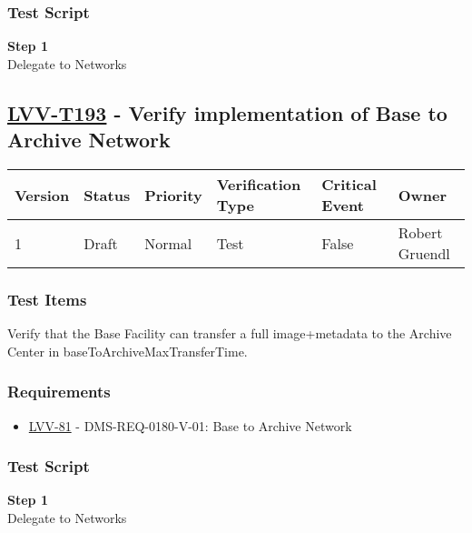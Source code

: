 \subsubsection{Test Script}\label{test-script-51}

\textbf{Step 1}\\
Delegate to Networks\\[2\baselineskip]

\hypertarget{lvv-t193---verify-implementation-of-base-to-archive-network}{\subsection{\texorpdfstring{\href{https://jira.lsstcorp.org/secure/Tests.jspa\#/testCase/LVV-T193}{LVV-T193}
- Verify implementation of Base to Archive
Network}{LVV-T193 - Verify implementation of Base to Archive Network}}\label{lvv-t193---verify-implementation-of-base-to-archive-network}}

\begin{longtable}[]{@{}llllll@{}}
\toprule
Version & Status & Priority & Verification Type & Critical Event &
Owner\tabularnewline
\midrule
\endhead
1 & Draft & Normal & Test & False & Robert Gruendl\tabularnewline
\bottomrule
\end{longtable}

\subsubsection{Test Items}\label{test-items-52}

Verify that the Base Facility can transfer a full image+metadata to the
Archive Center in baseToArchiveMaxTransferTime.

\subsubsection{Requirements}\label{requirements-52}

\begin{itemize}
\tightlist
\item
  \href{https://jira.lsstcorp.org/browse/LVV-81}{LVV-81} -
  DMS-REQ-0180-V-01: Base to Archive Network
\end{itemize}

\subsubsection{Test Script}\label{test-script-52}

\textbf{Step 1}\\
Delegate to Networks\\[2\baselineskip]


